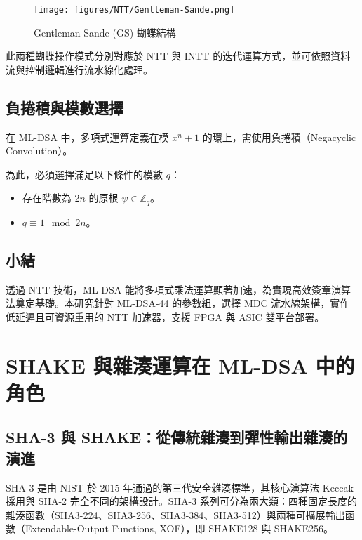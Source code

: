 \documentclass[12pt, a4paper, fleqn]{./styles/ntust_report}
\begin{document}
\begin{figure}[H]
    \centering
    \texttt{[image: figures/NTT/Gentleman-Sande.png]}
    \caption{Gentleman-Sande (GS) 蝴蝶結構}
    \label{fig:gs-butterfly}
\end{figure}

此兩種蝴蝶操作模式分別對應於 NTT 與 INTT 的迭代運算方式，並可依照資料流與控制邏輯進行流水線化處理。


\subsection{負捲積與模數選擇}

在 ML-DSA 中，多項式運算定義在模 $x^n + 1$ 的環上，需使用負捲積（Negacyclic Convolution）。

為此，必須選擇滿足以下條件的模數 $q$：
\begin{itemize}
  \item 存在階數為 $2n$ 的原根 $\psi \in \mathbb{Z}_q$。
  \item $q \equiv 1 \mod 2n$。
\end{itemize}



\subsection{小結}

透過 NTT 技術，ML-DSA 能將多項式乘法運算顯著加速，為實現高效簽章演算法奠定基礎。本研究針對 ML-DSA-44 的參數組，選擇 MDC 流水線架構，實作低延遲且可資源重用的 NTT 加速器，支援 FPGA 與 ASIC 雙平台部署。



\section{SHAKE 與雜湊運算在 ML-DSA 中的角色}
\subsection{SHA-3 與 SHAKE：從傳統雜湊到彈性輸出雜湊的演進}
SHA-3 是由 NIST 於 2015 年通過的第三代安全雜湊標準，其核心演算法 Keccak 採用與 SHA-2 完全不同的架構設計。SHA-3 系列可分為兩大類：四種固定長度的雜湊函數（SHA3-224、SHA3-256、SHA3-384、SHA3-512）與兩種可擴展輸出函數（Extendable-Output Functions, XOF），即 SHAKE128 與 SHAKE256。
\end{document}
